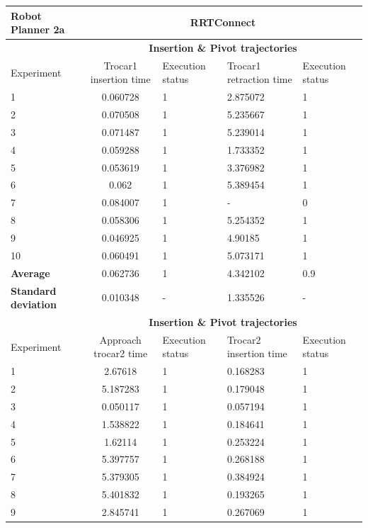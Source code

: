 \begin{longtable}{|p{2cm}|c|p{2cm}|p{2cm}|p{2cm}|}
\hline
Robot Planner 2a           & \multicolumn{4}{c}{\textbf{RRTConnect}}                                                                                                 \vline \\
\hline
                          & \multicolumn{4}{c}{\textbf{Insertion \& Pivot trajectories}}                     \vline \\
\hline
Experiment                & Trocar1 insertion time & Execution status & Trocar1 retraction time & Execution status  \\
\hline
1	& 0.060728	& 1	& 2.875072	& 1 \\
2	& 0.070508	& 1	& 5.235667	& 1 \\
3	& 0.071487	& 1	& 5.239014	& 1 \\
4	& 0.059288	& 1	& 1.733352	& 1 \\
5	& 0.053619	& 1	& 3.376982	& 1 \\
6	& 0.062	& 1	& 5.389454	& 1 \\
7	& 0.084007	& 1	& -	& 0 \\
8	& 0.058306	& 1	& 5.254352	& 1 \\
9	& 0.046925	& 1	& 4.90185	& 1 \\
10	& 0.060491	& 1	& 5.073171	& 1 \\
\hline
\textbf{Average} & 	0.062736	& 1	& 4.342102	& 0.9 \\
\hline
\textbf{Standard deviation} & 	0.010348 &	- &	1.335526 & - \\
\hline
                          & \multicolumn{4}{c}{\textbf{Insertion \& Pivot trajectories}}                     \vline \\
\hline
Experiment                & Approach trocar2 time & Execution status & Trocar2 insertion time & Execution status  \\
\hline
1 & 2.67618	& 1	& 0.168283	& 1 \\
2 & 5.187283	& 1	& 0.179048	& 1 \\
3 & 0.050117	& 1	& 0.057194	& 1 \\
4 & 1.538822	& 1	& 0.184641	& 1 \\
5 & 1.62114	& 1	& 0.253224	& 1 \\
6 & 5.397757	& 1	& 0.268188	& 1 \\
7 & 5.379305	& 1	& 0.384924	& 1 \\
8 & 5.401832	& 1	& 0.193265	& 1 \\
9 & 2.845741	& 1	& 0.267069	& 1 \\

\end{longtable}
